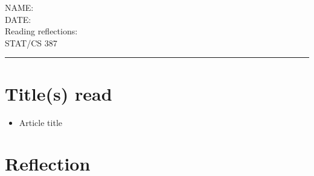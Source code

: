 \documentclass[11pt]{article}
\providecommand{\tightlist}{%
	\setlength{\itemsep}{0pt}\setlength{\parskip}{0pt}%
}
\begin{document}
\noindent NAME:                \\
DATE:                          \\
Reading reflections:           \\
STAT/CS 387

\hrule

\section*{Title(s) read}

\begin{itemize}\tightlist
\item  Article title
\end{itemize}


\section*{Reflection}
\end{document}
